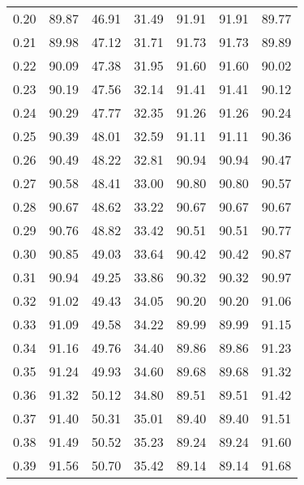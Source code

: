 \begin{tabular}{|c|c|c|c|c|c|c|}
      0.20 &     89.87 &     46.91 &      31.49 &   91.91 &      91.91 &         89.77 \\
      0.21 &     89.98 &     47.12 &      31.71 &   91.73 &      91.73 &         89.89 \\
      0.22 &     90.09 &     47.38 &      31.95 &   91.60 &      91.60 &         90.02 \\
      0.23 &     90.19 &     47.56 &      32.14 &   91.41 &      91.41 &         90.12 \\
      0.24 &     90.29 &     47.77 &      32.35 &   91.26 &      91.26 &         90.24 \\
      0.25 &     90.39 &     48.01 &      32.59 &   91.11 &      91.11 &         90.36 \\
      0.26 &     90.49 &     48.22 &      32.81 &   90.94 &      90.94 &         90.47 \\
      0.27 &     90.58 &     48.41 &      33.00 &   90.80 &      90.80 &         90.57 \\
      0.28 &     90.67 &     48.62 &      33.22 &   90.67 &      90.67 &         90.67 \\
      0.29 &     90.76 &     48.82 &      33.42 &   90.51 &      90.51 &         90.77 \\
      0.30 &     90.85 &     49.03 &      33.64 &   90.42 &      90.42 &         90.87 \\
      0.31 &     90.94 &     49.25 &      33.86 &   90.32 &      90.32 &         90.97 \\
      0.32 &     91.02 &     49.43 &      34.05 &   90.20 &      90.20 &         91.06 \\
      0.33 &     91.09 &     49.58 &      34.22 &   89.99 &      89.99 &         91.15 \\
      0.34 &     91.16 &     49.76 &      34.40 &   89.86 &      89.86 &         91.23 \\
      0.35 &     91.24 &     49.93 &      34.60 &   89.68 &      89.68 &         91.32 \\
      0.36 &     91.32 &     50.12 &      34.80 &   89.51 &      89.51 &         91.42 \\
      0.37 &     91.40 &     50.31 &      35.01 &   89.40 &      89.40 &         91.51 \\
      0.38 &     91.49 &     50.52 &      35.23 &   89.24 &      89.24 &         91.60 \\
      0.39 &     91.56 &     50.70 &      35.42 &   89.14 &      89.14 &         91.68 \\

\end{tabular}
